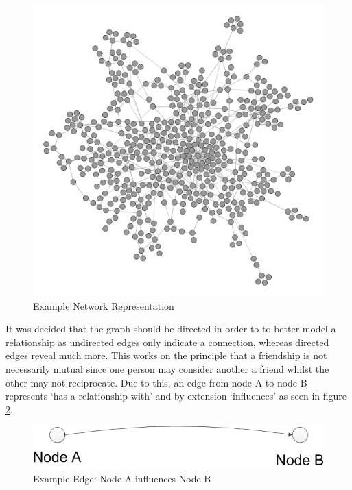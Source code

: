 \documentclass[]{report}
\begin{document}
\begin{figure}
\begin{center}
\includegraphics[scale=0.25]{example-graph.png}
\end{center}
\caption{Example Network Representation}
\label{img:ex-graph}
\end{figure}

It was decided that the graph should be directed in order to to better model a relationship as undirected edges only indicate a connection, whereas directed edges reveal much more. This works on the principle that a friendship is not necessarily mutual since one person may consider another a friend whilst the other may not reciprocate. Due to this, an edge from node A to node B represents `has a relationship with' and by extension `influences' as seen in figure \ref{img:ex-edge}.

\begin{figure}
\begin{center}
\includegraphics[scale=0.5]{example-edge.png}
\end{center}
\caption{Example Edge: Node A influences Node B}
\label{img:ex-edge}
\end{figure}
\end{document}
